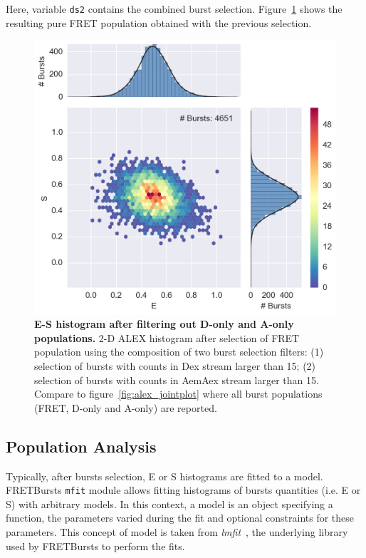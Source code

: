 \documentclass[10pt,letterpaper]{article}
\begin{document}
Here, variable \verb|ds2| contains the combined burst selection.
Figure~\ref{fig:alex_jointplot_fretsel} shows the resulting pure FRET
population obtained with the previous selection.


\begin{figure}[h!]
\begin{center}
\includegraphics[width=0.7\columnwidth]{figures/alex_jointplot_fretsel/alex_jointplot_fretsel}
\caption{\label{fig:alex_jointplot_fretsel}
\textbf{E-S histogram after filtering out D-only and A-only populations.}
2-D ALEX histogram after selection of FRET population
using the composition of two burst selection filters:
(1) selection of bursts with counts in Dex stream larger than 15;
(2) selection of bursts with counts in AemAex stream larger than 15.
Compare to figure~\ref{fig:alex_jointplot} where all burst populations
(FRET, D-only and A-only) are reported.%
}
\end{center}
\end{figure}

\subsection*{Population Analysis}
\label{sec:fretfit}

Typically, after bursts selection, E or S histograms are fitted to a model.
FRETBursts \verb|mfit| module allows fitting histograms of bursts quantities
(i.e. E or S) with arbitrary models. In this context, a model is an object
specifying a function, the parameters varied during the fit
and optional constraints for these parameters. This concept of model
is taken from \textit{lmfit}~\cite{lmfit}, the underlying library used by
FRETBursts to perform the fits.
\end{document}
